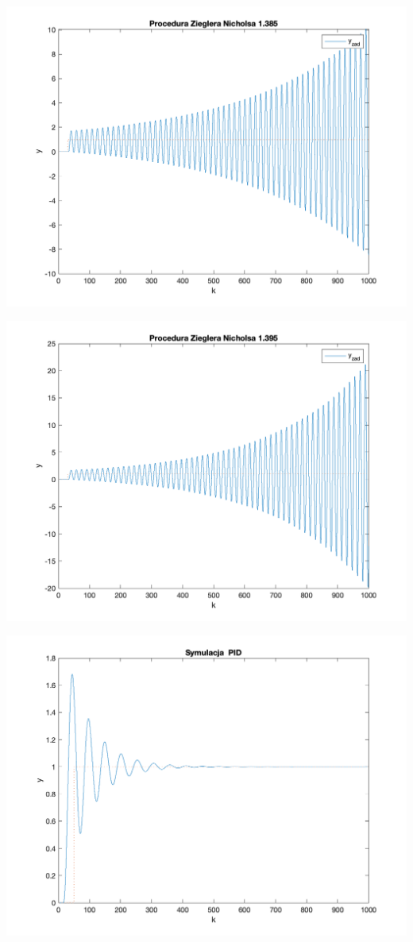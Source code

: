 \documentclass[a4paper, 11pt]{article}
\begin{document}
\begin{enumerate}
 \includegraphics[width=\linewidth]{./ModelsP3/ZN/P2_K1385png.png} 
 
 \includegraphics[width=\linewidth]{./ModelsP3/ZN/P2_K1395png.png} 
 
 \includegraphics[width=\linewidth]{./ModelsP3/PID/P4-2_r1_47532r2_-86292r3_39168.png} 
 

\end{enumerate}
\end{document}
